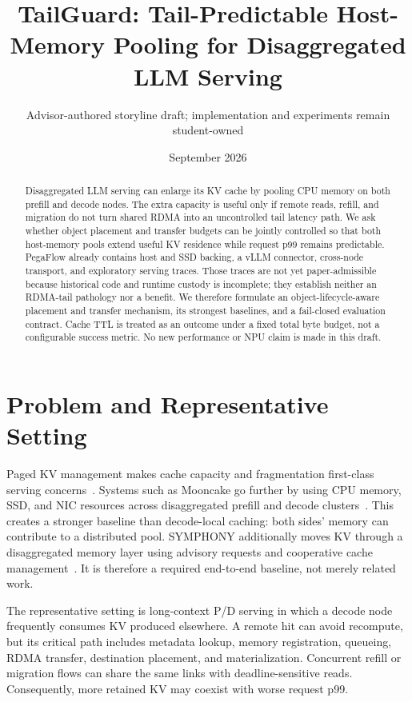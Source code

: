 \documentclass[10pt]{article}
\title{TailGuard: Tail-Predictable Host-Memory Pooling for Disaggregated LLM Serving}
\author{Advisor-authored storyline draft; implementation and experiments remain student-owned}
\date{September 2026}
\begin{document}
\maketitle

\begin{abstract}
Disaggregated LLM serving can enlarge its KV cache by pooling CPU memory on
both prefill and decode nodes. The extra capacity is useful only if remote
reads, refill, and migration do not turn shared RDMA into an uncontrolled tail
latency path. We ask whether object placement and transfer budgets can be
jointly controlled so that both host-memory pools extend useful KV residence
while request p99 remains predictable. PegaFlow already contains host and SSD
backing, a vLLM connector, cross-node transport, and exploratory serving
traces. Those traces are not yet paper-admissible because historical code and
runtime custody is incomplete; they establish neither an RDMA-tail pathology
nor a benefit. We therefore formulate an object-lifecycle-aware placement and
transfer mechanism, its strongest baselines, and a fail-closed evaluation
contract. Cache TTL is treated as an outcome under a fixed total byte budget,
not a configurable success metric. No new performance or NPU claim is made in
this draft.
\end{abstract}

\section{Problem and Representative Setting}

Paged KV management makes cache capacity and fragmentation first-class serving
concerns~\cite{kwon2023pagedattention}. Systems such as Mooncake go further by
using CPU memory, SSD, and NIC resources across disaggregated prefill and decode
clusters~\cite{qin2025mooncake}. This creates a stronger baseline than
decode-local caching: both sides' memory can contribute to a distributed pool.
SYMPHONY additionally moves KV through a disaggregated memory layer using
advisory requests and cooperative cache management~\cite{agarwal2026symphony}.
It is therefore a required end-to-end baseline, not merely related work.

The representative setting is long-context P/D serving in which a decode node
frequently consumes KV produced elsewhere. A remote hit can avoid recompute,
but its critical path includes metadata lookup, memory registration, queueing,
RDMA transfer, destination placement, and materialization. Concurrent refill
or migration flows can share the same links with deadline-sensitive reads.
Consequently, more retained KV may coexist with worse request p99.
\end{document}
